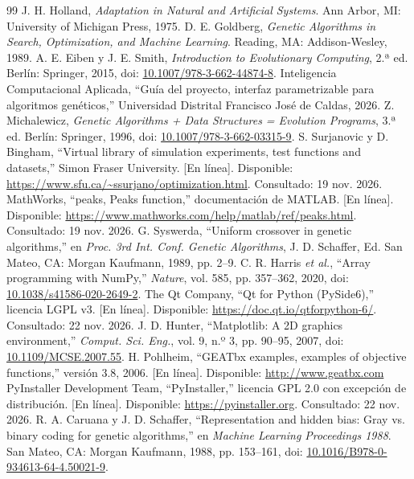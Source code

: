 \documentclass[conference]{IEEEtran}
\begin{document}
\begin{thebibliography}{99}
 J. H. Holland, \emph{Adaptation in Natural and Artificial Systems}. Ann Arbor, MI: University of Michigan Press, 1975.
 D. E. Goldberg, \emph{Genetic Algorithms in Search, Optimization, and Machine Learning}. Reading, MA: Addison-Wesley, 1989.
 A. E. Eiben y J. E. Smith, \emph{Introduction to Evolutionary Computing}, 2.ª ed. Berlín: Springer, 2015, doi: \url{10.1007/978-3-662-44874-8}.
 Inteligencia Computacional Aplicada, ``Guía del proyecto, interfaz parametrizable para algoritmos genéticos,'' Universidad Distrital Francisco José de Caldas, 2026.
 Z. Michalewicz, \emph{Genetic Algorithms + Data Structures = Evolution Programs}, 3.ª ed. Berlín: Springer, 1996, doi: \url{10.1007/978-3-662-03315-9}.
 S. Surjanovic y D. Bingham, ``Virtual library of simulation experiments, test functions and datasets,'' Simon Fraser University. [En línea]. Disponible: \url{https://www.sfu.ca/~ssurjano/optimization.html}. Consultado: 19 nov. 2026.
 MathWorks, ``peaks, Peaks function,'' documentación de MATLAB. [En línea]. Disponible: \url{https://www.mathworks.com/help/matlab/ref/peaks.html}. Consultado: 19 nov. 2026.
 G. Syswerda, ``Uniform crossover in genetic algorithms,'' en \emph{Proc. 3rd Int. Conf. Genetic Algorithms}, J. D. Schaffer, Ed. San Mateo, CA: Morgan Kaufmann, 1989, pp. 2--9.
 C. R. Harris \emph{et al.}, ``Array programming with NumPy,'' \emph{Nature}, vol. 585, pp. 357--362, 2020, doi: \url{10.1038/s41586-020-2649-2}.
 The Qt Company, ``Qt for Python (PySide6),'' licencia LGPL v3. [En línea]. Disponible: \url{https://doc.qt.io/qtforpython-6/}. Consultado: 22 nov. 2026.
 J. D. Hunter, ``Matplotlib: A 2D graphics environment,'' \emph{Comput. Sci. Eng.}, vol. 9, n.º 3, pp. 90--95, 2007, doi: \url{10.1109/MCSE.2007.55}.
 H. Pohlheim, ``GEATbx examples, examples of objective functions,'' versión 3.8, 2006. [En línea]. Disponible: \url{http://www.geatbx.com}
 PyInstaller Development Team, ``PyInstaller,'' licencia GPL 2.0 con excepción de distribución. [En línea]. Disponible: \url{https://pyinstaller.org}. Consultado: 22 nov. 2026.
 R. A. Caruana y J. D. Schaffer, ``Representation and hidden bias: Gray vs. binary coding for genetic algorithms,'' en \emph{Machine Learning Proceedings 1988}. San Mateo, CA: Morgan Kaufmann, 1988, pp. 153--161, doi: \url{10.1016/B978-0-934613-64-4.50021-9}.
\end{thebibliography}
\end{document}
